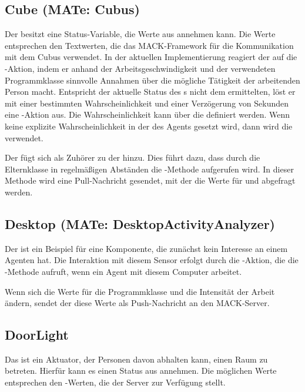 \subsection{Cube (MATe: Cubus)}
Der  besitzt eine Status-Variable, die Werte aus  annehmen kann. Die Werte entsprechen den Textwerten, die das MACK-Framework für die Kommunikation mit dem Cubus verwendet. In der aktuellen Implementierung reagiert der  auf die -Aktion, indem er anhand der Arbeitsgeschwindigkeit und der verwendeten Programmklasse sinnvolle Annahmen über die mögliche Tätigkeit der arbeitenden Person macht. Entspricht der aktuelle Status des s nicht dem ermittelten, löst er mit einer bestimmten Wahrscheinlichkeit und einer Verzögerung von  Sekunden eine -Aktion aus. Die Wahrscheinlichkeit kann über die  definiert werden. Wenn keine explizite Wahrscheinlichkeit in der  des Agents gesetzt wird, dann wird die  verwendet.

Der  fügt sich als Zuhörer zu der  hinzu. Dies führt dazu, dass durch die Elternklasse  in regelmäßigen Abständen die -Methode aufgerufen wird. In dieser Methode wird eine Pull-Nachricht gesendet, mit der die Werte für  und  abgefragt werden.

\subsection{Desktop (MATe: DesktopActivityAnalyzer)}
Der  ist ein Beispiel für eine Komponente, die zunächst kein Interesse an einem Agenten hat. Die Interaktion mit diesem Sensor erfolgt durch die -Aktion, die die -Methode aufruft, wenn ein Agent mit diesem Computer arbeitet.

Wenn sich die Werte für die Programmklasse und die Intensität der Arbeit ändern, sendet der  diese Werte als Push-Nachricht an den MACK-Server.

\subsection{DoorLight}
Das  ist ein Aktuator, der Personen davon abhalten kann, einen Raum zu betreten. Hierfür kann es einen Status aus  annehmen. Die möglichen Werte entsprechen den -Werten, die der Server zur Verfügung stellt.

